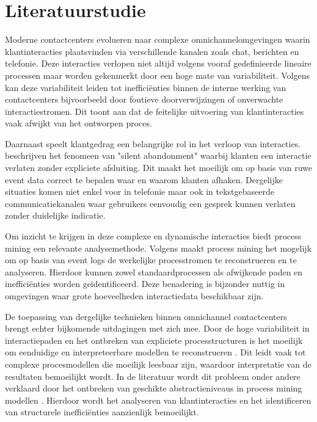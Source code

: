 

\section{Literatuurstudie}%
\label{sec:literatuurstudie}

Moderne contactcenters evolueren naar complexe omnichannelomgevingen waarin klantinteracties plaatsvinden via verschillende kanalen zoals chat, berichten en telefonie. Deze interacties verlopen niet altijd volgens vooraf gedefinieerde lineaire processen maar worden gekenmerkt door een hoge mate van variabiliteit. Volgens \textcite{Ellway2016} kan deze variabiliteit leiden tot inefficiënties binnen de interne werking van contactcenters bijvoorbeeld door foutieve doorverwijzingen of onverwachte interactiestromen. Dit toont aan dat de feitelijke uitvoering van klantinteracties vaak afwijkt van het ontworpen proces.

Daarnaast speelt klantgedrag een belangrijke rol in het verloop van interacties. \textcite{Antonio2024} beschrijven het fenomeen van "silent abandonment" waarbij klanten een interactie verlaten zonder expliciete afsluiting. Dit maakt het moeilijk om op basis van ruwe event data correct te bepalen waar en waarom klanten afhaken. Dergelijke situaties komen niet enkel voor in telefonie maar ook in tekstgebaseerde communicatiekanalen waar gebruikers eenvoudig een gesprek kunnen verlaten zonder duidelijke indicatie.

Om inzicht te krijgen in deze complexe en dynamische interacties biedt process mining een relevante analysemethode. Volgens \textcite{vanDerAalst2016} maakt process mining het mogelijk om op basis van event logs de werkelijke processtromen te reconstrueren en te analyseren. Hierdoor kunnen zowel standaardprocessen als afwijkende paden en inefficiënties worden geïdentificeerd. Deze benadering is bijzonder nuttig in omgevingen waar grote hoeveelheden interactiedata beschikbaar zijn.

De toepassing van dergelijke technieken binnen omnichannel contactcenters brengt echter bijkomende uitdagingen met zich mee. Door de hoge variabiliteit in interactiepaden en het ontbreken van expliciete processtructuren is het moeilijk om eenduidige en interpreteerbare modellen te reconstrueren \autocite{Ellway2016, vanDerAalst2016}. Dit leidt vaak tot complexe procesmodellen die moeilijk leesbaar zijn, waardoor interpretatie van de resultaten bemoeilijkt wordt. In de literatuur wordt dit probleem onder andere verklaard door het ontbreken van geschikte abstractieniveaus in process mining modellen \autocite{Jagadeesh2009}. Hierdoor wordt het analyseren van klantinteracties en het identificeren van structurele inefficiënties aanzienlijk bemoeilijkt.

